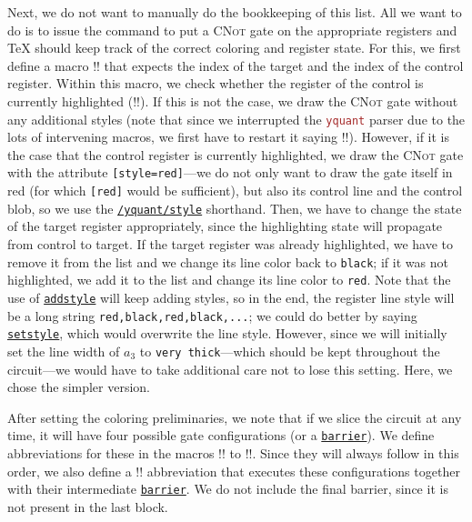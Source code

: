 \documentclass{scrartcl}
\def\pkg#1{\textcolor{brown}{\texttt{#1}}}
\def\gate#1{\hyperref[gate:#1]{\texttt{#1}}}
\def\style#1{\hyperref[style:#1]{\texttt{#1}}}
\def\Yquant{\pkg{yquant}}
\begin{document}
\begin{example}
               Next, we do not want to manually do the bookkeeping of this list.
               All we want to do is to issue the command to put a \textsc{CNot} gate on the appropriate registers and \TeX{} should keep track of the correct coloring and register state.
               For this, we first define a macro \tex!\cnot! that expects the index of the target and the index of the control register.
               Within this macro, we check whether the register of the control is currently highlighted (\tex!\high!).
               If this is not the case, we draw the \textsc{CNot} gate without any additional styles (note that since we interrupted the \Yquant{} parser due to the lots of intervening macros, we first have to restart it saying \tex!\yquant!).
               However, if it is the case that the control register is currently highlighted, we draw the \textsc{CNot} gate with the attribute \texttt{[style=red]}---we do not only want to draw the gate itself in red (for which \texttt{[red]} would be sufficient), but also its control line and the control blob, so we use the \style{/yquant/style} shorthand.
               Then, we have to change the state of the target register appropriately, since the highlighting state will propagate from control to target.
               If the target register was already highlighted, we have to remove it from the list and we change its line color back to \texttt{black}; if it was not highlighted, we add it to the list and change its line color to \texttt{red}.
               Note that the use of \gate{addstyle} will keep adding styles, so in the end, the register line style will be a long string \texttt{red,black,red,black,...}; we could do better by saying \gate{setstyle}, which would overwrite the line style.
               However, since we will initially set the line width of $a_3$ to \texttt{very thick}---which should be kept throughout the circuit---we would have to take additional care not to lose this setting.
               Here, we chose the simpler version.

               After setting the coloring preliminaries, we note that if we slice the circuit at any time, it will have four possible gate configurations (or a \gate{barrier}).
               We define abbreviations for these in the macros \tex!\cnotA! to \tex!\cnotD!.
               Since they will always follow in this order, we also define a \tex!\cnotBlock! abbreviation that executes these configurations together with their intermediate \gate{barrier}.
               We do not include the final barrier, since it is not present in the last block.


\end{example}
\end{document}
